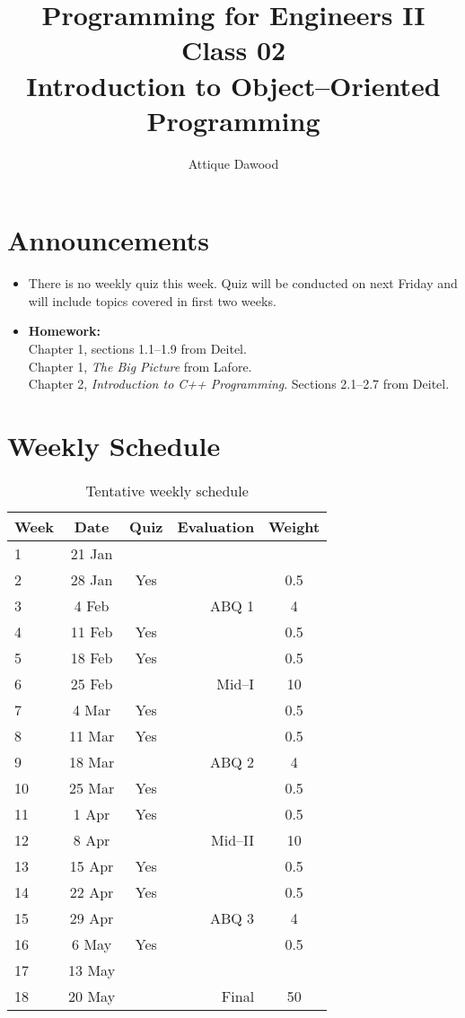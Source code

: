 \documentclass[12pt,a4paper]{article}
\title{\vspace{-2cm}Programming for Engineers II\\Class 02\\Introduction to Object--Oriented Programming}
\author{Attique Dawood}
\begin{document}
\maketitle
\section{Announcements}
\begin{itemize}
\item There is no weekly quiz this week. Quiz will be conducted on next Friday and will include topics covered in first two weeks.
\item \textbf{Homework:}\\
Chapter 1, sections 1.1--1.9 from Deitel.\\
Chapter 1, \textit{The Big Picture} from Lafore.\\
Chapter 2, \textit{Introduction to C++ Programming}. Sections 2.1--2.7 from Deitel.
\end{itemize}
\section{Weekly Schedule}
\begin{table}[H]
\begin{center}
\vspace{-0.3cm}
	\begin{tabular}{lccrc}
	\hline \hline
		\rule{0pt}{2.6ex} \textbf{Week} & \textbf{Date} & \textbf{Quiz} & \textbf{Evaluation} & \textbf{Weight}\\
		\hline
		1 \rule{0pt}{2.6ex} & 21 Jan & & & \\
		2 & 28 Jan & Yes & & 0.5 \\
		3 & 4 Feb & & ABQ 1 & 4 \\
		4 & 11 Feb & Yes & & 0.5 \\
		5 & 18 Feb & Yes & & 0.5 \\
		6 & 25 Feb & & Mid--I & 10 \\
		7 & 4 Mar & Yes & & 0.5 \\
		8 & 11 Mar & Yes & & 0.5 \\
		9 & 18 Mar & & ABQ 2& 4 \\
		10 & 25 Mar & Yes & & 0.5 \\
		11 & 1 Apr & Yes & & 0.5 \\
		12 & 8 Apr & & Mid--II& 10 \\
		13 & 15 Apr & Yes & & 0.5 \\
		14 & 22 Apr & Yes & & 0.5 \\
		15 & 29 Apr & & ABQ 3& 4 \\
		16 & 6 May & Yes & & 0.5 \\
		17 & 13 May & & & \\
		18 & 20 May & & Final & 50 \\
	\hline \hline
	\end{tabular}
\end{center}
\label{Tentative-Weekly-Schedule}
\caption{Tentative weekly schedule}
\end{table}
\end{document}
